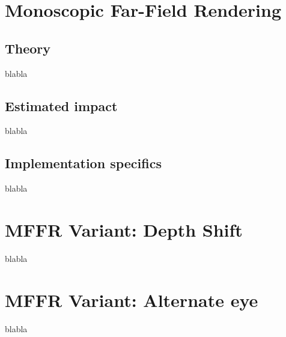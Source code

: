 
\section{Monoscopic Far-Field Rendering}
\subsection{Theory}
blabla
\subsection{Estimated impact}
blabla
\subsection{Implementation specifics}
blabla



\section{MFFR Variant: Depth Shift}
blabla

\section{MFFR Variant: Alternate eye}
blabla
